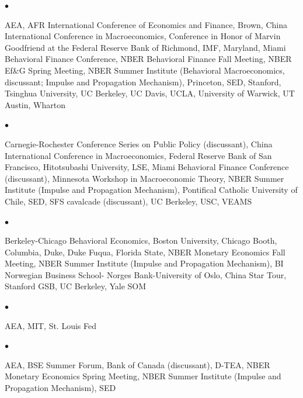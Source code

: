 \documentclass[line]{res}
\newenvironment{list1}{
  \begin{list}{\ding{113}}{%
      \setlength{\itemsep}{0.07in}
      \setlength{\parsep}{0in} \setlength{\parskip}{0in}
		\setlength{\topsep}{0.07in} \setlength{\partopsep}{0in}
      \setlength{\leftmargin}{0.0in}}}{\end{list}}
\newenvironment{list2}{
  \begin{list}{$\bullet$}{%
      \setlength{\itemsep}{0in}
      \setlength{\parsep}{0in} \setlength{\parskip}{0in}
      \setlength{\topsep}{0in} \setlength{\partopsep}{0in} 
      \setlength{\leftmargin}{0in}}}{\end{list}}
\begin{document}
\begin{resume}
\begin{list1}
\item[2022]
\begin{list2}
\item[] AEA, AFR International Conference of Economics and Finance, Brown, China International Conference in Macroeconomics, Conference in Honor of Marvin Goodfriend at the Federal Reserve Bank of Richmond, IMF, Maryland, Miami Behavioral Finance Conference, NBER Behavioral Finance Fall Meeting, NBER Ef\&G Spring Meeting, NBER Summer Institute (Behavioral Macroeconomics, discussant; Impulse and Propagation Mechanism), Princeton, SED, Stanford, Tsinghua University, UC Berkeley, UC Davis, UCLA, University of Warwick, UT Austin, Wharton
\end{list2}

\item[2021]
\begin{list2}
\item[] Carnegie-Rochester Conference Series on Public Policy (discussant), China International Conference in Macroeconomics, Federal Reserve Bank of San Francisco, Hitotsubashi University, LSE, Miami Behavioral Finance Conference (discussant), Minnesota Workshop in Macroeconomic Theory, NBER Summer Institute (Impulse and Propagation Mechanism), Pontifical Catholic University of Chile, SED, SFS cavalcade (discussant), UC Berkeley, USC, VEAMS
\end{list2}

\item[2020]
\begin{list2}
\item[] Berkeley-Chicago Behavioral Economics, Boston University, Chicago Booth, Columbia, Duke, Duke Fuqua, Florida State, NBER Monetary Economics Fall Meeting, NBER Summer Institute (Impulse and Propagation Mechanism), BI Norwegian Business School- Norges Bank-University of Oslo, China Star Tour, Stanford GSB, UC Berkeley, Yale SOM
\end{list2}

\item[2019] 
\begin{list2}
\item[] AEA, MIT, St. Louis Fed
\end{list2}

\item[2018] 
\begin{list2}
\item[] AEA, BSE Summer Forum, Bank of Canada (discussant), D-TEA, NBER Monetary Economics Spring Meeting, NBER Summer Institute (Impulse and Propagation Mechanism), SED
\end{list2}


\end{list1}
\end{resume}
\end{document}
